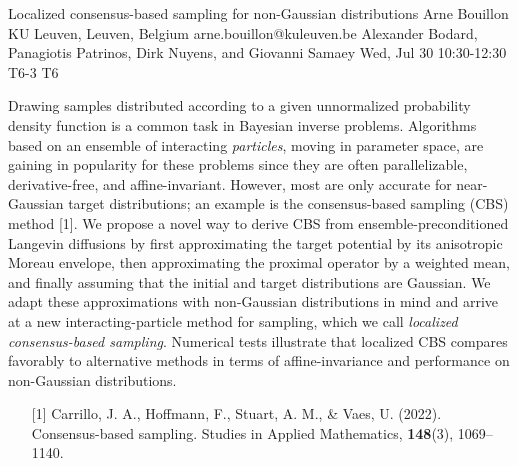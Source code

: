 \begin{talk}
  {Localized consensus-based sampling for non-Gaussian distributions}%
  {Arne Bouillon}%
  {KU Leuven, Leuven, Belgium}%
  {arne.bouillon@kuleuven.be}%
  {Alexander Bodard, Panagiotis Patrinos, Dirk Nuyens, and Giovanni Samaey}%
  {}%
  {Wed, Jul 30 10:30-12:30}%
  {T6-3}%
  {T6}%
  
				

  Drawing samples distributed according to a given unnormalized probability density function is a common task in Bayesian inverse problems. Algorithms based on an ensemble of interacting \emph{particles}, moving in parameter space, are gaining in popularity for these problems since they are often parallelizable, derivative-free, and affine-invariant. However, most are only accurate for near-Gaussian target distributions; an example is the consensus-based sampling (CBS) method [1]. We propose a novel way to derive CBS from ensemble-preconditioned Langevin diffusions by first approximating the target potential by its anisotropic Moreau envelope, then approximating the proximal operator by a weighted mean, and finally assuming that the initial and target distributions are Gaussian. We adapt these approximations with non-Gaussian distributions in mind and arrive at a new interacting-particle method for sampling, which we call \emph{localized consensus-based sampling}. Numerical tests illustrate that localized CBS compares favorably to alternative methods in terms of affine-invariance and performance on non-Gaussian distributions.
\medskip

\begin{enumerate}
  \item[{[1]}] Carrillo, J. A., Hoffmann, F., Stuart, A. M., \& Vaes, U. (2022). Consensus-based sampling. Studies in Applied Mathematics, \textbf{148}(3), 1069--1140.
\end{enumerate}
\end{talk}

